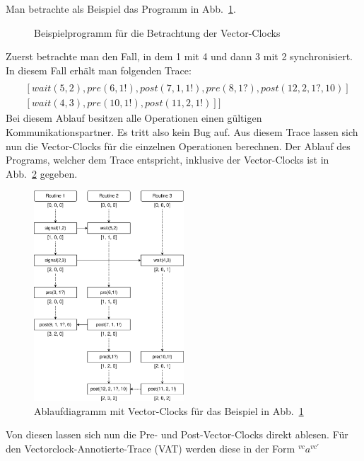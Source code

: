Man betrachte als Beispiel das Programm in Abb.~\ref{Chap:Analyze-Sec:Channel-SubSec:Dangling-Fig:PorgVC}.
\begin{figure}[h!]
  \centering
  
  \caption{Beispielprogramm für die Betrachtung der Vector-Clocks}
  \label{Chap:Analyze-Sec:Channel-SubSec:Dangling-Fig:PorgVC}
\end{figure}
Zuerst betrachte man den Fall, in dem 1 mit 4 und dann 3 mit 2 synchronisiert.
In diesem Fall erhält man folgenden Trace:
\begin{align*}
  [&[signal(1, 2), signal(2, 3), pre(3, 1?), post(9, 1, 1?, 6)]\\
  &[wait(5, 2), pre(6, 1!), post(7, 1, 1!), pre(8, 1?), post(12, 2, 1?, 10)]\\
  &[wait(4, 3), pre(10, 1!), post(11, 2, 1!)]]
\end{align*}
Bei diesem Ablauf besitzen alle Operationen einen gültigen 
Kommunikationspartner. Es tritt also kein Bug auf.
Aus diesem Trace lassen sich nun die Vector-Clocks für die einzelnen Operationen berechnen.
Der Ablauf des Programs, welcher dem Trace entspricht, inklusive der Vector-Clocks 
ist in Abb.~\ref{Chap:Analyze-Sec:Channel-SubSec:Dangling-Fig:VC} gegeben.
\begin{figure}[h!]
  \centering
  \includegraphics[width=0.5\textwidth]{img/vc.eps}
  \caption{Ablaufdiagramm mit Vector-Clocks für das Beispiel in Abb.~\ref{Chap:Analyze-Sec:Channel-SubSec:Dangling-Fig:PorgVC}}
  \label{Chap:Analyze-Sec:Channel-SubSec:Dangling-Fig:VC}
\end{figure}
Von diesen lassen sich nun die Pre- und Post-Vector-Clocks direkt ablesen.
Für den Vectorclock-Annotierte-Trace (VAT) werden diese in der Form $^{vc}a^{vc'}$ 
